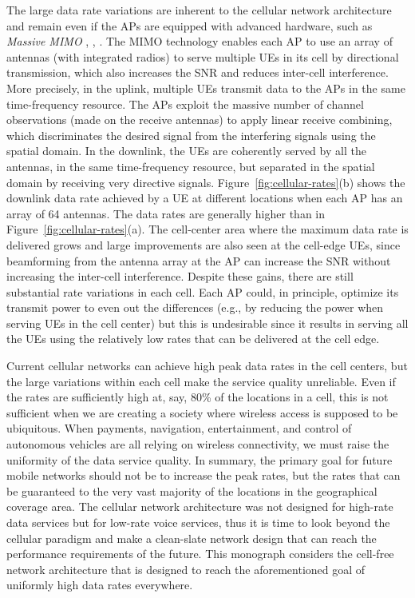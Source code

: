 The large data rate variations are inherent to the cellular network architecture and remain even if the \glspl{AP} are equipped with advanced hardware, such as \emph{Massive \gls{MIMO}} \cite{massivemimobook}, \cite{Marzetta2010a}, \cite{Marzetta2016a}. The \gls{MIMO} technology enables each \gls{AP} to use an array of antennas (with integrated radios) to serve multiple \glspl{UE} in its cell by directional transmission, which also increases the \gls{SNR} and reduces inter-cell interference.
More precisely, in the uplink, multiple \glspl{UE} transmit data to the \glspl{AP} in the same time-frequency resource. The \glspl{AP} exploit the massive number of channel observations (made on the receive antennas) to apply linear receive combining, which discriminates the desired signal from the interfering signals using the spatial domain. 
In the downlink, the \glspl{UE} are coherently served by all the antennas, in the same time-frequency resource, but separated in the spatial domain by receiving very directive signals. 
 Figure~\ref{fig:cellular-rates}(b) shows the downlink data rate achieved by a \gls{UE} at different locations when each \gls{AP} has an array of 64 antennas. The data rates are generally higher than in Figure~\ref{fig:cellular-rates}(a). The cell-center area where the maximum data rate is delivered grows and large improvements are also seen at the  cell-edge \glspl{UE}, since beamforming from the antenna array at the \gls{AP} can increase the \gls{SNR} without increasing the inter-cell interference. Despite these gains, there are still substantial rate variations in each cell. Each AP could, in principle, optimize its transmit power to even out the differences (e.g., by reducing the power when serving UEs in the cell center) but this is undesirable since it results in serving all the UEs using the relatively low rates that can be delivered at the cell edge.
 
 \enlargethispage{\baselineskip} 
 
Current cellular networks can achieve high peak data rates in the cell centers, but the large variations within each cell make the service quality unreliable. Even if the rates are sufficiently high at, say, 80\% of the locations in a cell, this is not sufficient when we are creating a society where wireless access is supposed to be ubiquitous. When payments, navigation, entertainment, and control of autonomous vehicles are all relying on wireless connectivity, we must raise the uniformity of the data service quality. 
In summary, the primary goal for future mobile networks should not be to increase the peak rates, but the rates that can be guaranteed to the very vast majority of the locations in the geographical coverage area. 
The cellular network architecture was not designed for high-rate data services but for low-rate voice services, thus it is time to look beyond the cellular paradigm and make a clean-slate network design that can reach the performance requirements of the future. 
This monograph considers the cell-free network architecture that is designed to reach the aforementioned goal of uniformly high data rates everywhere.


